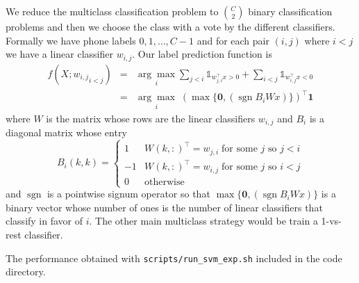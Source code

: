 \documentclass{article}
\begin{document}
We reduce the multiclass classification problem to $\binom{C}{2}$ binary classification problems and then we choose the class with a vote
by the different classifiers.  Formally we have phone labels $0,1,\ldots,C-1$
and for each pair $(i,j)$ where $i<j$ we have a linear classifier
$w_{i,j}$.  Our label prediction function is
\begin{equation*}\begin{array}{rcl}
f(X ; {w_{i,j}}_{i<j}) &=&\underset{i}{\arg\max} \sum_{j<i} \mathds{1}_{w_{j,i}^{\top}x > 0} + \sum_{i<j} \mathds{1}_{w_{i,j}^{\top}x < 0}\\
&=& \underset{i}{\arg\max} \; (\max\{\mathbf{0},(\operatorname{sgn} B_iWx)\})^\top \mathbf{1}
\end{array}\end{equation*}
where $W$ is the matrix whose rows are the linear classifiers $w_{i,j}$ and $B_i$ is a diagonal matrix whose entry 
$$B_i(k,k) = \begin{cases} 1 & W(k,:)^{\top} = w_{j,i}\;\text{for some } j\text{ so }j<i\\
                       -1 & W(k,:)^\top = w_{i,j}\;\text{for some } j\text{ so }i<j\\
                    0 & \text{otherwise}   \end{cases}$$
and $\operatorname{sgn}$ is a pointwise signum operator so that $\max\{\mathbf{0},(\operatorname{sgn} B_iWx)\}$ is a binary vector
whose number of ones is the number of linear classifiers that classify in favor of $i$.
The other main multiclass strategy would be train a 1-vs-rest classifier.

The performance obtained with \texttt{scripts/run\_svm\_exp.sh} included in the code directory.
\end{document}
